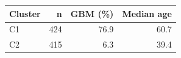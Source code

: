 \begin{tabular}{lrrr}
\toprule
\textbf{Cluster} & \textbf{n} & \textbf{GBM (\%)} & \textbf{Median age} \\
\midrule
C1 & 424 & 76.9 & 60.7 \\
C2 & 415 & 6.3 & 39.4 \\
\bottomrule
\end{tabular}
